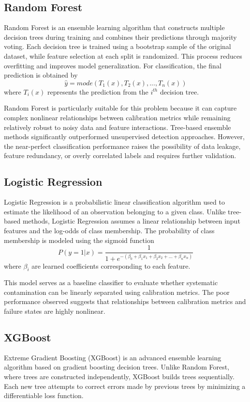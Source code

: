 \documentclass[linenumbers,trackchanges]{aastex701}
\begin{document}
\subsection{Random Forest}
Random Forest is an ensemble learning algorithm that constructs multiple decision trees during training and combines their predictions through majority voting. Each decision tree is trained using a bootstrap sample of the original dataset, while feature selection at each split is randomized. This process reduces overfitting and improves model generalization. For classification, the final prediction is obtained by
\begin{equation}
\hat{y} = mode(T_1(x), T_2(x), ..., T_n(x))
\end{equation}
where $T_i(x)$ represents the prediction from the $i^{th}$ decision tree.

Random Forest is particularly suitable for this problem because it can capture complex nonlinear relationships between calibration metrics while remaining relatively robust to noisy data and feature interactions. Tree-based ensemble methods significantly outperformed unsupervised detection approaches. However, the near-perfect classification performance raises the possibility of data leakage, feature redundancy, or overly correlated labels and requires further validation.

\subsection{Logistic Regression}
Logistic Regression is a probabilistic linear classification algorithm used to estimate the likelihood of an observation belonging to a given class. Unlike tree-based methods, Logistic Regression assumes a linear relationship between input features and the log-odds of class membership. The probability of class membership is modeled using the sigmoid function
\begin{equation}
P(y=1|x)=\frac{1}{1+e^{-(\beta_0+\beta_1x_1+\beta_2x_2+...+\beta_nx_n)}}
\end{equation}
where $\beta_i$ are learned coefficients corresponding to each feature. 

This model serves as a baseline classifier to evaluate whether systematic contamination can be linearly separated using calibration metrics. The poor performance observed suggests that relationships between calibration metrics and failure states are highly nonlinear.

\subsection{XGBoost}
Extreme Gradient Boosting (XGBoost) is an advanced ensemble learning algorithm based on gradient boosting decision trees. Unlike Random Forest, where trees are constructed independently, XGBoost builds trees sequentially. Each new tree attempts to correct errors made by previous trees by minimizing a differentiable loss function.
\end{document}
